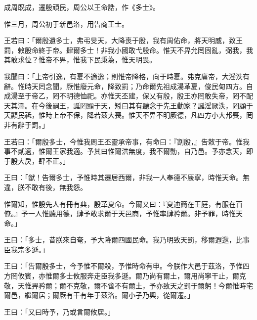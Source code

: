
\begin{pinyinscope}
成周既成，遷殷頑民，周公以王命誥，作《多士》。

惟三月，周公初于新邑洛，用告商王士。

王若曰：「爾殷遺多士，弗弔旻天，大降喪于殷，我有周佑命，將天明威，致王罰，敕殷命終于帝。肆爾多士！非我小國敢弋殷命。惟天不畀允罔固亂，弼我，我其敢求位？惟帝不畀，惟我下民秉為，惟天明畏。

我聞曰：「上帝引逸，有夏不適逸；則惟帝降格，向于時夏。弗克庸帝，大淫泆有辭。惟時天罔念聞，厥惟廢元命，降致罰；乃命爾先祖成湯革夏，俊民甸四方。自成湯至于帝乙，罔不明德恤祀。亦惟天丕建，保乂有殷，殷王亦罔敢失帝，罔不配天其澤。在今後嗣王，誕罔顯于天，矧曰其有聽念于先王勤家？誕淫厥泆，罔顧于天顯民祗，惟時上帝不保，降若茲大喪。惟天不畀不明厥德，凡四方小大邦喪，罔非有辭于罰。」

王若曰：「爾殷多士，今惟我周王丕靈承帝事，有命曰：『割殷，』告敕于帝。惟我事不貳適，惟爾王家我適。予其曰惟爾洪無度，我不爾動，自乃邑。予亦念天，即于殷大戾，肆不正。」

王曰：「猷！告爾多士，予惟時其遷居西爾，非我一人奉德不康寧，時惟天命。無違，朕不敢有後，無我怨。

惟爾知，惟殷先人有冊有典，殷革夏命。今爾又曰：『夏迪簡在王庭，有服在百僚。』予一人惟聽用德，肆予敢求爾于天邑商，予惟率肆矜爾。非予罪，時惟天命。」

王曰：「多士，昔朕來自奄，予大降爾四國民命。我乃明致天罰，移爾遐逖，比事臣我宗多遜。」

王曰：「告爾殷多士，今予惟不爾殺，予惟時命有申。今朕作大邑于茲洛，予惟四方罔攸賓，亦惟爾多士攸服奔走臣我多遜。爾乃尚有爾土，爾用尚寧干止，爾克敬，天惟畀矜爾；爾不克敬，爾不啻不有爾土，予亦致天之罰于爾躬！今爾惟時宅爾邑，繼爾居；爾厥有干有年于茲洛。爾小子乃興，從爾遷。」

王曰：「又曰時予，乃或言爾攸居。」


\end{pinyinscope}